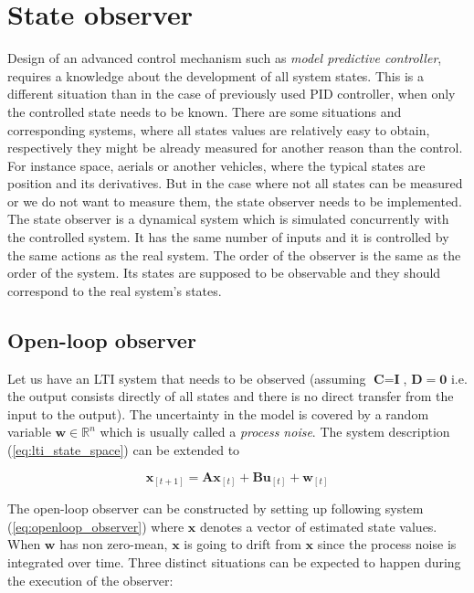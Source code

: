 \section{State observer}

Design of an advanced control mechanism such as \textit{model predictive controller}, requires a knowledge about the development of all system states. This is a different situation than in the case of previously used PID controller, when only the controlled state needs to be known. There are some situations and corresponding systems, where all states values are relatively easy to obtain, respectively they might be already measured for another reason than the control. For instance space, aerials or another vehicles, where the typical states are position and its derivatives. But in the case where not all states can be measured or we do not want to measure them, the state observer needs to be implemented. The state observer is a dynamical system which is simulated concurrently with the controlled system. It has the same number of inputs and it is controlled by the same actions as the real system. The order of the observer is the same as the order of the system. Its states are supposed to be observable and they should correspond to the real system's states.

\subsection{Open-loop observer}

Let us have an LTI system that needs to be observed (assuming $\textbf{C} = \textbf{I}$, $\textbf{D} = \mathbf{0}$ i.e. the output consists directly of all states and there is no direct transfer from the input to the output). The uncertainty in the model is covered by a random variable $\textbf{w} \in \mathbb{R}^n$ which is usually called a \emph{process noise}. The system description (\ref{eq:lti_state_space}) can be extended to

\begin{equation}
\textbf{x}_{[t+1]} = \textbf{A}\textbf{x}_{[t]} + \textbf{B}\textbf{u}_{[t]} + \textbf{w}_{[t]}
\label{eq:lti_for_observer}
\end{equation}

The open-loop observer can be constructed by setting up following system (\ref{eq:openloop_observer}) where $\textbf{\^x}$ denotes a vector of estimated state values. When $\textbf{w}$ has non zero-mean, $\textbf{\^x}$ is going to drift from $\textbf{x}$ since the process noise is integrated over time. Three distinct situations can be expected to happen during the execution of the observer:

